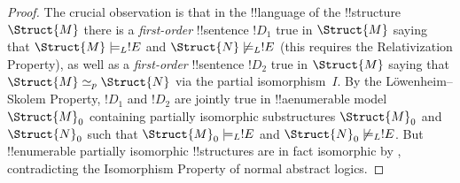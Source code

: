 \documentclass[../../../include/open-logic-section]{subfiles}
\begin{document}
\begin{proof}
The crucial observation is that in the !!{language} of the
!!{structure}~$\Struct{M}$ there is a \emph{first-order} !!{sentence} $!D_1$
true in $\Struct{M}$ saying that $\Struct{M} \models_L !E$ and
$\Struct{N} \not\models_L !E$ (this requires the Relativization
Property), as well as a \emph{first-order} !!{sentence} $!D_2$ true in
$\Struct{M}$ saying that $\Struct{M} \simeq_p \Struct{N}$ via the
partial isomorphism~$I$. By the L\"owenheim--Skolem Property, $!D_1$
and $!D_2$ are jointly true in !!a{enumerable} model $\Struct{M}_0$
containing partially isomorphic substructures $\Struct{M}_0$ and
$\Struct{N}_0$ such that $\Struct{M}_0 \models_L !E$ and $\Struct{N}_0
\not\models_L !E$. But !!{enumerable} partially isomorphic !!{structure}s are
in fact isomorphic by , contradicting the
Isomorphism Property of normal abstract logics.
\end{proof}
\end{document}
